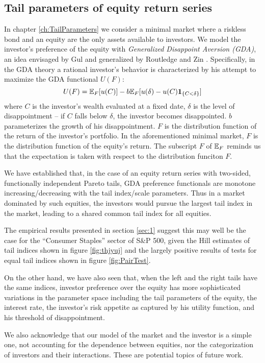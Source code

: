 \subsection{Tail parameters of equity return series}
In chapter \ref{ch:TailParameters} we consider a
minimal market where a riskless bond and an equity are the only assets
available to investors. We model the investor's preference of the
equity with {\em Generalized Disappoint Aversion (GDA)}, an idea envisaged
by Gul \cite{gul:1991} and generalized by Routledge and Zin
\cite{routledge2010generalized}. Specifically, in the GDA theory a
rational investor's behavior is characterized by his attempt to
maximize the GDA functional $U(F)$:
\[
U(F) = \mathbb{E}_F[u(C)] - b \mathbb{E}_F[u(\delta) - u(C)\mathbf{1}_{\{C < \delta\}}]
\]
where $C$ is the investor's wealth evaluated at a fixed date, $\delta$
is the level of disappointment -- if $C$ falls below $\delta$, the
investor becomes disappointed. $b$ parameterizes the growth of his
disappointment. $F$ is the distribution function of the return of the
investor's portfolio. In the aforementioned minimal market,
$F$ is the distribution function of the equity's return. The subscript
$F$ of $\mathbb{E}_F$ reminds us that the expectation is taken with respect to
the distribution funciton $F$.

We have established that, in the case of an equity return series with
two-sided, functionally independent Pareto tails, GDA preference
functionals are monotone increasing/decreasing with the
tail index/scale parameters. Thus in a market dominated by such
equities, the investors would pursue the largest tail index in the
market, leading to a shared common tail index for all equities.

The empirical results presented in section \ref{sec:1} suggest this
may well be the case for the ``Consumer Staples'' sector of S\&P 500,
given the Hill estimates of tail indices shown in figure
\ref{fig:thjyuj} and the largely positive results of tests for equal
tail indices shown in figure \ref{fig:PairTest}.

On the other hand, we have also seen that, when the left and the right
tails have the same indices, investor preference over the equity has
more sophisticated variations in the parameter space including the
tail parameters of the equity, the interest rate, the investor's risk
appetite as captured by his utility function, and his threshold of
disappointment.

We also acknowledge that our model of the market and the investor is a
simple one, not accounting for the dependence between equities, nor
the categorization of investors and their interactions. These are
potential topics of future work.

